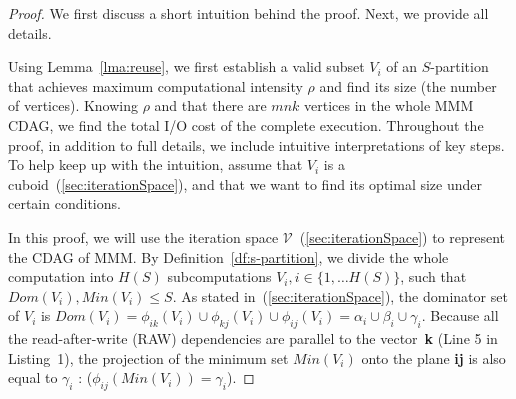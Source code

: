 \begin{proof}
	
	We first discuss a short intuition behind
	the proof. Next, we provide all details.
	
	Using Lemma~\ref{lma:reuse}, we first establish a valid subset $V_i$ of an
	$S$-partition that achieves maximum computational intensity $\rho$ and find 
	its
	size (the number of vertices). Knowing $\rho$ and that there are $mnk$
	vertices in the whole MMM CDAG, we find the total
	I/O cost of the complete execution. Throughout the proof, in addition to
	full details, we include intuitive interpretations of key steps. To
	help keep up with the intuition, assume that $V_i$ is a 
	cuboid~(\cref{sec:iterationSpace}), and that we want to find its optimal 
	size 
	under certain conditions.
	
	
	In this proof, we will use the iteration space 
	$\mathcal{V}$~(\cref{sec:iterationSpace}) to represent the 
	CDAG of MMM.
	By Definition~\ref{df:s-partition}, we divide the whole computation into
	$H(S)$ subcomputations $V_i, i \in \{1,\dots H(S)\}$, such that $Dom(V_i), 
	Min(V_i) \le 
	S$. As stated in~(\cref{sec:iterationSpace}), the dominator set of 
	$V_i$ is $Dom(V_i) =\phi_{ik}(V_i) \cup \phi_{kj}(V_i) \cup \phi_{ij}(V_i) 
	= 
	\alpha_i \cup \beta_i \cup \gamma_i$. Because all the read-after-write 
	(RAW) 
	dependencies are parallel to the vector~\textbf{k} (Line 5 in 
	Listing~1), the projection of the minimum set $Min(V_i)$ onto the plane 
	\textbf{ij} is also equal to $\gamma_i$ : ($\phi_{ij}(Min(V_i)) = 
	\gamma_i$).
	

\end{proof}
